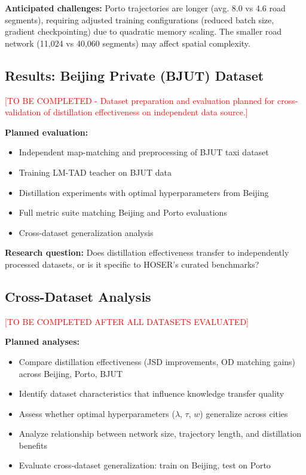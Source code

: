 \textbf{Anticipated challenges:} Porto trajectories are longer (avg. 8.0 vs 4.6 road segments), requiring adjusted training configurations (reduced batch size, gradient checkpointing) due to quadratic memory scaling. The smaller road network (11,024 vs 40,060 segments) may affect spatial complexity.

\subsection{Results: Beijing Private (BJUT) Dataset}
\label{sec:eval-bjut}

\textcolor{red}{[TO BE COMPLETED - Dataset preparation and evaluation planned for cross-validation of distillation effectiveness on independent data source.]}

\textbf{Planned evaluation:}
\begin{itemize}[noitemsep,topsep=0pt]
    \item Independent map-matching and preprocessing of BJUT taxi dataset
    \item Training LM-TAD teacher on BJUT data
    \item Distillation experiments with optimal hyperparameters from Beijing
    \item Full metric suite matching Beijing and Porto evaluations
    \item Cross-dataset generalization analysis
\end{itemize}

\textbf{Research question:} Does distillation effectiveness transfer to independently processed datasets, or is it specific to HOSER's curated benchmarks?

\subsection{Cross-Dataset Analysis}
\label{sec:eval-cross}

\textcolor{red}{[TO BE COMPLETED AFTER ALL DATASETS EVALUATED]}

\textbf{Planned analyses:}
\begin{itemize}[noitemsep,topsep=0pt]
    \item Compare distillation effectiveness (JSD improvements, OD matching gains) across Beijing, Porto, BJUT
    \item Identify dataset characteristics that influence knowledge transfer quality
    \item Assess whether optimal hyperparameters ($\lambda$, $\tau$, $w$) generalize across cities
    \item Analyze relationship between network size, trajectory length, and distillation benefits
    \item Evaluate cross-dataset generalization: train on Beijing, test on Porto
\end{itemize}

